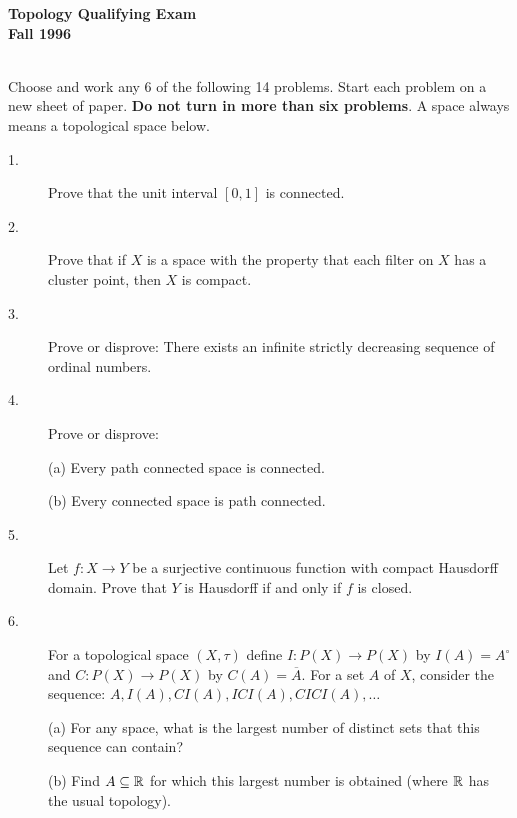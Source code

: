 \documentclass{article}
\begin{document}

 
\begin{center}\begin{LARGE}
{\bf Topology   Qualifying Exam}\\ 
{\bf Fall 1996}\\ \end{LARGE}
\end{center}
\vspace{0.1in}
\noindent\hrulefill\\

Choose and work any 6 of the following 14 problems. Start each problem
on a new sheet of paper. {\bf Do not turn in more than six problems}. A
space always means a topological space below.

\begin{description}

\item[1.]
Prove that the unit interval $[0,1]$ is connected.

\item[2.]
Prove that if $X$ is a space with the property that each filter on $X$
has a cluster point, then $X$ is compact.

\item[3.]
Prove or disprove: There exists an infinite strictly decreasing sequence of
ordinal numbers.

\item[4.]
Prove or disprove:

\item[\quad] (a)
Every path connected space is connected.

\item[\quad] (b)
Every connected space is path connected.

\item[5.]
Let $f:X \to Y$ be a surjective continuous function with compact Hausdorff
domain. Prove that $Y$ is Hausdorff if and only if $f$ is closed.

\item[6.]
For a topological space $(X, \tau)$ define $I: P (X) \to P(X)$ by
$I(A) = A^\circ$ and $C : P(X) \to P(X)$ by $C(A) = \overline A$.
For a set $A$ of $X$, consider the sequence:
$A, I(A), CI(A), ICI(A), CICI(A), \dots$

\item[\quad] (a)
For any space, what is the largest number of distinct sets that this
sequence can contain?

\item[\quad] (b)
Find $A \subseteq \Bbb R$ for which this largest number is obtained (where
$\Bbb R$ has the usual topology).


\end{description}
\end{document}
